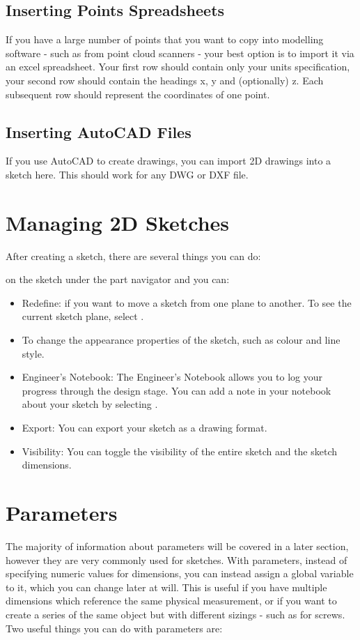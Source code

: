 \begin{enumerate}
\subsection{Inserting Points Spreadsheets}

\mediumdifficulty
If you have a large number of points that you want to copy into modelling software - such as from point cloud scanners - your best option is to import it via an excel spreadsheet. Your first row should contain only your units specification, your second row should contain the headings x, y and (optionally) z. Each subsequent row should represent the coordinates of one point.


\subsection{Inserting AutoCAD Files}\cbstart
If you use AutoCAD to create drawings, you can import 2D drawings into a sketch here. This should work for any DWG or DXF file.

\section{Managing 2D Sketches}

\easydifficulty

After creating a sketch, there are several things you can do:

 on the sketch under the part navigator and you can:
\begin{itemize}
\item Redefine: if you want to move a sketch from one plane to another. To see the current sketch plane, select .
\item To change the appearance properties of the sketch, such as colour and line style.
\item Engineer's Notebook: The Engineer's Notebook allows you to log your progress through the design stage. You can add a note in your notebook about your sketch by selecting .
\item Export: You can export your sketch as a drawing format.
\item Visibility: You can toggle the visibility of the entire sketch and the sketch dimensions.
\end{itemize}

\section{Parameters}
\label{section:param}
The majority of information about parameters will be covered in a later section, however they are very commonly used for sketches. With parameters, instead of specifying numeric values for dimensions, you can instead assign a global variable to it, which you can change later at will. This is useful if you have multiple dimensions which reference the same physical measurement, or if you want to create a series of the same object but with different sizings - such as for screws. Two useful things you can do with parameters are:


\end{enumerate}
